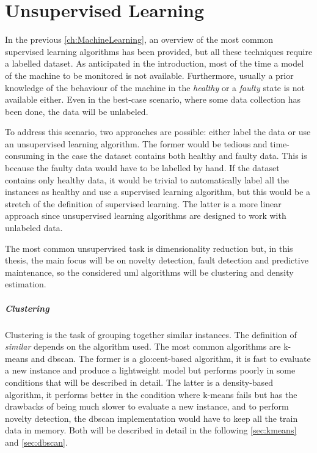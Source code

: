 \chapter{Unsupervised Learning}
\label{ch:Unsupervised}

In the previous \autoref{ch:MachineLearning}, an overview of the most common supervised learning algorithms has been provided, but all these techniques require a labelled dataset. As anticipated in the introduction, most of the time a model of the machine to be monitored is not available. Furthermore, usually a prior knowledge of the behaviour of the machine in the \emph{healthy} or a \emph{faulty} state is not available either. Even in the best-case scenario, where some data collection has been done, the data will be unlabeled. 

To address this scenario, two approaches are possible: either label the data or use an unsupervised learning algorithm. The former would be tedious and time-consuming in the case the dataset contains both healthy and faulty data. This is because the faulty data would have to be labelled by hand. If the dataset contains only healthy data, it would be trivial to automatically label all the instances as healthy and use a supervised learning algorithm, but this would be a stretch of the definition of supervised learning. The latter is a more linear approach since unsupervised learning algorithms are designed to work with unlabeled data.

The most common unsupervised task is dimensionality reduction  but, in this thesis, the main focus will be on novelty detection, fault detection and predictive maintenance, so the considered \gls{uml} algorithms will be clustering and density estimation.

\paragraph[]{Clustering}
Clustering is the task of grouping together similar instances. The definition of \emph{similar} depends on the algorithm used. The most common algorithms are {k-means} and \gls{dbscan}. The former is a \gls{glo:cent}-based algorithm, it is fast to evaluate a new instance and produce a lightweight model but performs poorly in some conditions that will be described in detail. The latter is a density-based algorithm, it performs better in the condition where k-means fails but has the drawbacks of being much slower to evaluate a new instance, and to perform novelty detection, the \gls{dbscan} implementation would have to keep all the train data in memory. Both will be described in detail in the following \autoref{sec:kmeans} and \autoref{sec:dbscan}.

